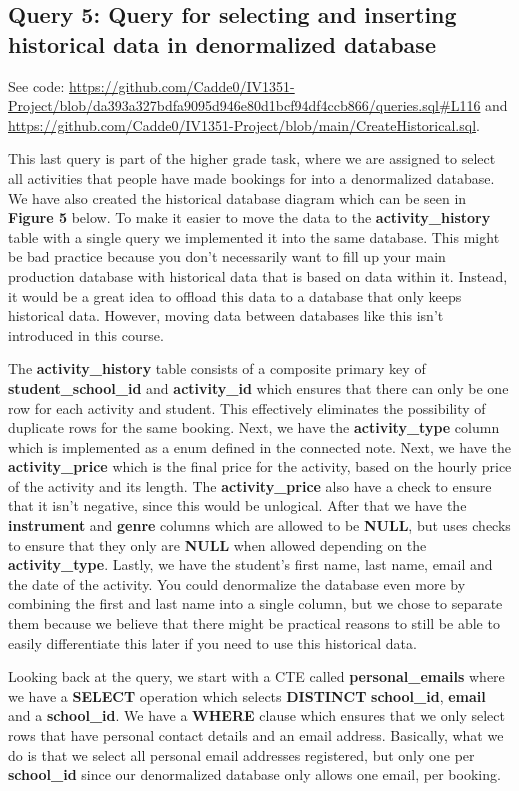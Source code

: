 \documentclass[a4paper]{scrartcl}
\begin{document}
\subsection{Query 5: Query for selecting and inserting historical data in denormalized database}
See code: \url{https://github.com/Cadde0/IV1351-Project/blob/da393a327bdfa9095d946e80d1bcf94df4ccb866/queries.sql#L116} and \url{https://github.com/Cadde0/IV1351-Project/blob/main/CreateHistorical.sql}.

This last query is part of the higher grade task, where we are assigned to select all activities that people have made bookings for into a denormalized database. We have also created the historical database diagram which can be seen in \textbf{Figure 5} below. To make it easier to move the data to the \textbf{activity\_history} table with a single query we implemented it into the same database. This might be bad practice because you don't necessarily want to fill up your main production database with historical data that is based on data within it. Instead, it would be a great idea to offload this data to a database that only keeps historical data. However, moving data between databases like this isn't introduced in this course.

The \textbf{activity\_history} table consists of a composite primary key of \textbf{student\_school\_id} and \textbf{activity\_id} which ensures that there can only be one row for each activity and student. This effectively eliminates the possibility of duplicate rows for the same booking. Next, we have the \textbf{activity\_type} column which is implemented as a enum defined in the connected note. Next, we have the \textbf{activity\_price} which is the final price for the activity, based on the hourly price of the activity and its length. The \textbf{activity\_price} also have a check to ensure that it isn't negative, since this would be unlogical. After that we have the \textbf{instrument} and \textbf{genre} columns which are allowed to be \textbf{NULL}, but uses checks to ensure that they only are \textbf{NULL} when allowed depending on the \textbf{activity\_type}. Lastly, we have the student's first name, last name, email and the date of the activity. You could denormalize the database even more by combining the first and last name into a single column, but we chose to separate them because we believe that there might be practical reasons to still be able to easily differentiate this later if you need to use this historical data.

Looking back at the query, we start with a CTE called \textbf{personal\_emails} where we have a \textbf{SELECT} operation which selects \textbf{DISTINCT} \textbf{school\_id}, \textbf{email} and a \textbf{school\_id}. We have a \textbf{WHERE} clause which ensures that we only select rows that have personal contact details and an email address. Basically, what we do is that we select all personal email addresses registered, but only one per \textbf{school\_id} since our denormalized database only allows one email, per booking.
\end{document}
